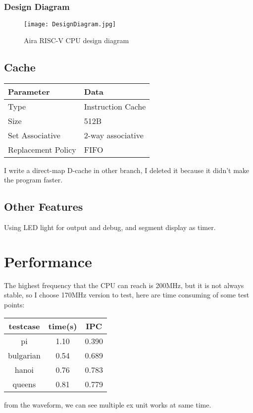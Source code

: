 \documentclass[UTF8]{ctexart}
\begin{document}
    \subsubsection{Design Diagram}

    \begin{figure}[h]
    \texttt{[image: DesignDiagram.jpg]}
    \caption{Aira RISC-V CPU design diagram}
    \end{figure}

    \subsection{Cache}
    \begin{center}
        \begin{tabular}{ll}
            \hline
            Parameter & Data\\
            \hline
            Type & Instruction Cache \\
            \hline
            Size & 512B              \\
            \hline
            Set Associative & 2-way associative \\
            \hline
            Replacement Policy & FIFO \\
            \hline
        \end{tabular}
    \end{center}
    I write a direct-map D-cache in other branch, I deleted it because it didn't make the program faster.
    \subsection{Other Features}
    Using LED light for output and debug, and segment display as timer.
\section{Performance}
    The highest frequency that the CPU can reach is 200MHz, but it is not always 
    stable, so I choose 170MHz version to test, here are time consuming of some test points:
    \begin{center}
        \begin{tabular}{ccc}
            \hline
            testcase & time(s) & IPC \\
            \hline
            pi & 1.10  & 0.390\\
            \hline
            bulgarian & 0.54  & 0.689\\
            \hline
            hanoi & 0.76  & 0.783\\
            \hline
            queens & 0.81  & 0.779\\
            \hline
        \end{tabular}
    \end{center}
    from the waveform, we can see multiple ex unit works at same time.
\end{document}
